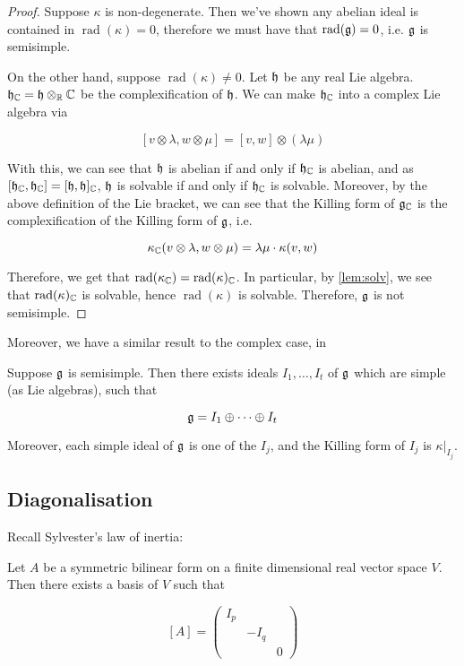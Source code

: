 \documentclass{article}
\DeclareMathOperator{\rad}{rad}
\begin{document}
\begin{proof}
    Suppose \(\kappa\) is non-degenerate. Then we've shown any abelian ideal is contained in \(\rad(\kappa) = 0\), therefore we must have that \(\rad(\mfg) = 0\), i.e. \(\mathfrak{g}\) is semisimple.

    On the other hand, suppose \(\rad(\kappa) \ne 0\). Let \(\mathfrak{h}\) be any real Lie algebra. \(\mathfrak{h}_{\mathbb{C}} = \mathfrak{h} \otimes_{\mathbb{R}} \mathbb{C}\) be the complexification of \(\mathfrak{h}\). We can make \(\mathfrak{h}_{\mathbb{C}}\) into a complex Lie algebra via

    \[[v \otimes \lambda, w \otimes \mu] = [v, w] \otimes (\lambda\mu)\]

    With this, we can see that \(\mathfrak{h}\) is abelian if and only if \(\mathfrak{h}_{\mathbb{C}}\) is abelian, and as \([\mathfrak{h}_{\mathbb{C}}, \mathfrak{h}_{\mathbb{C}}] = [\mathfrak{h}, \mathfrak{h}]_{\mathbb{C}}\), \(\mathfrak{h}\) is solvable if and only if \(\mathfrak{h}_{\mathbb{C}}\) is solvable. Moreover, by the above definition of the Lie bracket, we can see that the Killing form of \(\mathfrak{g}_{\mathbb{C}}\) is the complexification of the Killing form of \(\mathfrak{g}\), i.e.

    \[\kappa_{\mathbb{C}}(v \otimes \lambda, w \otimes \mu) = \lambda\mu \cdot \kappa(v, w)\]

    Therefore, we get that \(\rad(\kappa_\C) = \rad(\kappa)_\C\). In particular, by \cref{lem:solv}, we see that \(\rad(\kappa)_\C\) is solvable, hence \(\rad(\kappa)\) is solvable. Therefore, \(\mathfrak{g}\) is not semisimple.
\end{proof}

Moreover, we have a similar result to the complex case, in

\begin{theorem}
    Suppose \(\mathfrak{g}\) is semisimple. Then there exists ideals \(I_1, \dots, I_t\) of \(\mathfrak{g}\) which are simple (as Lie algebras), such that

    \[\mathfrak{g} = I_1 \oplus \cdots \oplus I_t\]

    Moreover, each simple ideal of \(\mathfrak{g}\) is one of the \(I_j\), and the Killing form of \(I_j\) is \(\kappa\vert_{I_j}\).
\end{theorem}

\subsection{Diagonalisation}

Recall Sylvester's law of inertia:

\begin{theorem}
    Let \(A\) be a symmetric bilinear form on a finite dimensional real vector space \(V\). Then there exists a basis of \(V\) such that

    \[[A] = \begin{pmatrix}
        I_p \\ & -I_q \\ && 0
    \end{pmatrix}\]
\end{theorem}
\end{document}
